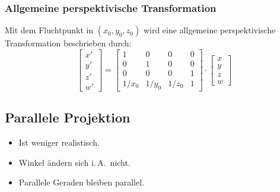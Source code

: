 \documentclass[a4paper, 11pt, accentcolor = tud3b]{tudreport}
\newcommand{\iA}{i.\,A.~}
\begin{document}
				\subsubsection{Allgemeine perspektivische Transformation}
					Mit dem Fluchtpunkt in \( (x_0, y_0, z_0) \) wird eine allgemeine perspektivische Transformation beschrieben durch:
					\begin{equation*}
						\begin{bmatrix}
							x' \\
							y' \\
							z' \\
							w'
						\end{bmatrix}
						=
						\begin{bmatrix}
							1     & 0     & 0     & 0 \\
							0     & 1     & 0     & 0 \\
							0     & 0     & 0     & 1 \\
							1/x_0 & 1/y_0 & 1/z_0 & 1
						\end{bmatrix}
						\cdot
						\begin{bmatrix}
							x \\
							y \\
							z \\
							w
						\end{bmatrix}
					\end{equation*}

			\subsection{Parallele Projektion}
				\begin{itemize}
					\item Ist weniger realistisch.
					\item Winkel ändern sich \iA nicht.
					\item Parallele Geraden bleiben parallel.
				\end{itemize}
			
\end{document}
